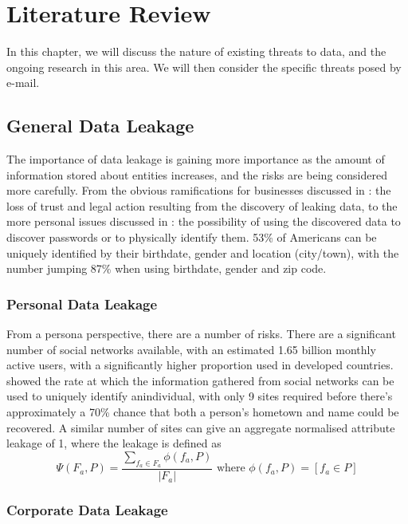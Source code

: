 \chapter{Literature Review}\label{chap:exres}

In this chapter, we will discuss the nature of existing threats to data, and the
ongoing research in this area.  We will then consider the specific threats posed
by e-mail.

\section{General Data Leakage}

The importance of data leakage is gaining more importance as the amount of
information stored about entities increases, and the risks are being considered
more carefully.  From the obvious ramifications for businesses discussed in
\cite{papadimitriou2011data}: the loss of trust and legal action resulting from
the discovery of leaking data, to the more personal issues discussed in
\cite{irani2011modeling}: the possibility of using the discovered data to
discover passwords or to physically identify them.  53\% of Americans can be
uniquely identified by their birthdate, gender and location (city/town), with
the number jumping 87\% when using birthdate, gender and zip code.

\subsection{Personal Data Leakage}

From a persona perspective, there are a number of risks.  There are a
significant number of social networks available, with an estimated 1.65 billion
monthly active users, with a significantly higher proportion used in developed
countries.  \cite{irani2011modeling} showed the rate at which the information
gathered from social networks can be used to uniquely identify anindividual,
with only 9 sites required before there's approximately a 70\% chance that both
a person's hometown and name could be recovered.  A similar number of sites can
give an aggregate normalised attribute leakage of 1, where the leakage is
defined as \[\Psi(F_a,P)=\frac{\sum_{f_a\in F_a}\phi\left(f_a,
			P\right)}{|F_a|}\text{ where }\phi\left(f_a, P\right) =
	\left[f_a\in P\right]\]

\subsection{Corporate Data Leakage}

